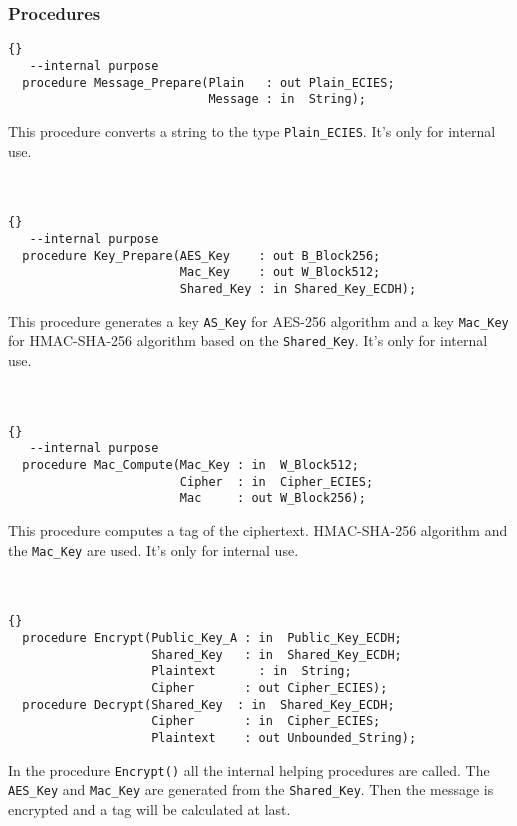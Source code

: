 \subsubsection*{Procedures}
\begin{lstlisting}{}
   --internal purpose
  procedure Message_Prepare(Plain   : out Plain_ECIES;
                            Message : in  String);
\end{lstlisting}
This procedure converts a string to the type \texttt{Plain\_ECIES}. It's only for internal use.\\
\hline \\ \ \\
\begin{lstlisting}{}
   --internal purpose
  procedure Key_Prepare(AES_Key    : out B_Block256;
                        Mac_Key    : out W_Block512;
                        Shared_Key : in Shared_Key_ECDH);
\end{lstlisting}
This procedure generates a key \texttt{AS\_Key} for AES-256 algorithm and a key \texttt{Mac\_Key} for HMAC-SHA-256 algorithm based on the \texttt{Shared\_Key}. It's only for internal use.\\
\hline \\ \ \\
\begin{lstlisting}{}
   --internal purpose
  procedure Mac_Compute(Mac_Key : in  W_Block512;
                        Cipher  : in  Cipher_ECIES;
                        Mac     : out W_Block256);
\end{lstlisting}
This procedure computes a tag of the ciphertext. HMAC-SHA-256 algorithm and the \texttt{Mac\_Key} are used. It's only for internal use.\\
\hline \\ \ \\
\begin{lstlisting}{}
  procedure Encrypt(Public_Key_A : in  Public_Key_ECDH;
                    Shared_Key   : in  Shared_Key_ECDH;
                    Plaintext	   : in  String;
                    Cipher       : out Cipher_ECIES);
  procedure Decrypt(Shared_Key	: in  Shared_Key_ECDH;
                    Cipher       : in  Cipher_ECIES;
                    Plaintext    : out Unbounded_String);

\end{lstlisting}
In the procedure \texttt{Encrypt()} all the internal helping procedures are called. The \texttt{AES\_Key} and \texttt{Mac\_Key} are generated from the \texttt{Shared\_Key}. Then the message is encrypted  and a tag will be calculated at last. 
